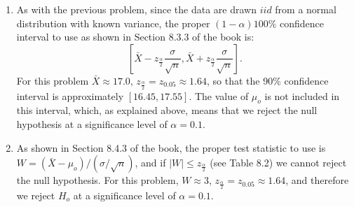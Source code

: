 \begin{problem}{16}$ $
\begin{enumerate}
\item As with the previous problem, since the data are drawn $iid$ from a normal distribution with known variance, the proper $(1-\alpha)100\%$ confidence interval to use as shown in Section 8.3.3 of the book is:
\begin{equation*}
\left[\bar X- z_{\frac{\alpha}{2}}\frac{\sigma}{\sqrt{n}}, \bar X+ z_{\frac{\alpha}{2}}\frac{\sigma}{\sqrt{n}}  \right].
\end{equation*}
For this problem $\bar X \approx 17.0 $, $z_{\frac{\alpha}{2}} = z_{0.05} \approx 1.64$, so that the 90\% confidence interval is approximately $[16.45, 17.55]$.  The value of $\mu_o$ is not included in this interval, which, as explained above, means that we reject the null hypothesis at a significance level of $\alpha = 0.1$.

\item  As shown in Section 8.4.3 of the book, the proper test statistic to use is $W=(\bar X-\mu_o)/(\sigma/\sqrt{n})$, and if $|W| \le z_{\frac{\alpha}{2}}$ (see Table 8.2) we cannot reject the null hypothesis.  For this problem, $W \approx 3$, $z_{\frac{\alpha}{2}} = z_{0.05} \approx 1.64$, and therefore we reject $H_o$ at a significance level of $\alpha=0.1$.






\end{enumerate}

\end{problem} 

